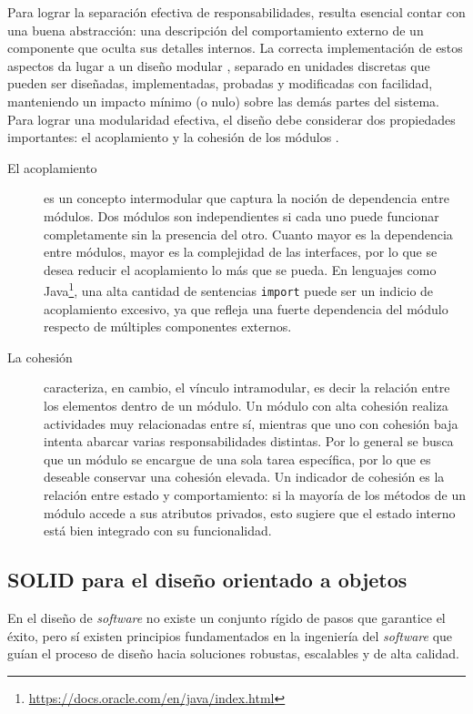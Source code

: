Para lograr la separación efectiva de responsabilidades, resulta esencial contar con una buena abstracción: una descripción del comportamiento externo de un componente que oculta sus detalles internos. La correcta implementación de estos aspectos da lugar a un diseño modular \citep{parnas1972modularization}, separado en unidades discretas que pueden ser diseñadas, implementadas, probadas y modificadas con facilidad, manteniendo un impacto mínimo (o nulo) sobre las demás partes del sistema. Para lograr una modularidad efectiva, el diseño debe considerar dos propiedades importantes: el acoplamiento y la cohesión de los módulos \citep{jalote1997integrated}.

\begin{description}
    \item[El acoplamiento] es un concepto intermodular que captura la noción de dependencia entre módulos. Dos módulos son independientes si cada uno puede funcionar completamente sin la presencia del otro. Cuanto mayor es la dependencia entre módulos, mayor es la complejidad de las interfaces, por lo que se desea reducir el acoplamiento lo más que se pueda. En lenguajes como Java\footnote{\url{https://docs.oracle.com/en/java/index.html}}, una alta cantidad de sentencias \texttt{import} puede ser un indicio de acoplamiento excesivo, ya que refleja una fuerte dependencia del módulo respecto de múltiples componentes externos.
    
    \item[La cohesión] caracteriza, en cambio, el vínculo intramodular, es decir la relación entre los elementos dentro de un módulo. Un módulo con alta cohesión realiza actividades muy relacionadas entre sí, mientras que uno con cohesión baja intenta abarcar varias responsabilidades distintas. Por lo general se busca que un módulo se encargue de una sola tarea específica, por lo que es deseable conservar una cohesión elevada. Un indicador de cohesión es la relación entre estado y comportamiento: si la mayoría de los métodos de un módulo accede a sus atributos privados, esto sugiere que el estado interno está bien integrado con su funcionalidad.
\end{description}

\subsection{SOLID para el diseño orientado a objetos}

En el diseño de \emph{software} no existe un conjunto rígido de pasos que garantice el éxito, pero sí existen principios fundamentados en la ingeniería del \emph{software} que guían el proceso de diseño hacia soluciones robustas, escalables y de alta calidad.

